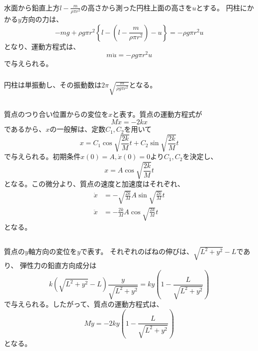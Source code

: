 \documentclass[a4paper]{jsarticle}
\begin{document}
\subsubsection{}
水面から鉛直上方$l - \frac{m}{\rho \pi r^2}$の高さから測った円柱上面の高さを$u$とする。
円柱にかかる$y$方向の力は、
\begin{equation}
  -m g + \rho g \pi r^2 \left\{l - \left(l - \frac{m}{\rho \pi r^2}\right) - u\right\}
  = -\rho g \pi r^2 u
\end{equation}
となり、運動方程式は、
\begin{equation}
  m \ddot{u} = -\rho g \pi r^2 u
\end{equation}
で与えられる。

\subsubsection{}
円柱は単振動し、その振動数は$2 \pi \sqrt{\frac{m}{\rho g \pi r^2}}$となる。

\subsection{}
\subsubsection{}
質点のつり合い位置からの変位を$x$と表す。質点の運動方程式が
\begin{equation}
  M \ddot{x} = -2 k x
\end{equation}
であるから、$x$の一般解は、定数$C_1, C_2$を用いて
\begin{equation}
  x = C_1 \cos \sqrt{\frac{2k}{M}} t  + C_2 \sin \sqrt{\frac{2k}{M}} t
\end{equation}
で与えられる。初期条件$x(0) = A, \dot{x}(0) = 0$より$C_1, C_2$を決定し、
\begin{equation}
  x = A \cos \sqrt{\frac{2k}{M}} t
\end{equation}
となる。この微分より、質点の速度と加速度はそれぞれ、
\begin{align}
  \dot{x} &= -\sqrt{\frac{2k}{M}} A \sin \sqrt{\frac{2k}{M}} t \\
  \ddot{x} &= -\frac{2k}{M} A \cos \sqrt{\frac{2k}{M}} t
\end{align}
となる。

\subsection{}
質点の$y$軸方向の変位を$y$で表す。
それぞれのばねの伸びは、$\sqrt{L^2 + y^2} - L$であり、
弾性力の鉛直方向成分は
\begin{equation}
  k \left(\sqrt{L^2 + y^2} - L\right) \frac{y}{\sqrt{L^2 + y^2}}
  = k y \left(1 - \frac{L}{\sqrt{L^2 + y^2}}\right)
\end{equation}
で与えられる。したがって、質点の運動方程式は、
\begin{equation}
  M \ddot{y} = -2k y \left(1 - \frac{L}{\sqrt{L^2 + y^2}}\right)
\end{equation}
となる。
\end{document}
